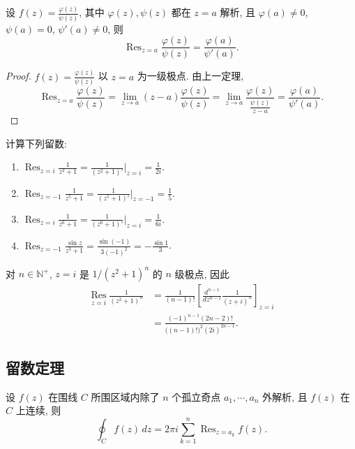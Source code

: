 \documentclass[theorem=false,mathfont=none,openany,sub3section]{easybook}
\begin{document}
\begin{theorem}
  设 $f(z)=\frac{\varphi(z)}{\psi(z)}$, 其中 $\varphi(z),\psi(z)$ 都在 $z=a$ 解析, 且 $\varphi(a)\neq0$, $\psi(a)=0$, $\psi'(a)\neq0$, 则
  \[
  \operatorname{Res}_{z=a}\frac{\varphi(z)}{\psi(z)}=\frac{\varphi(a)}{\psi'(a)}.
  \]
\end{theorem}

\begin{proof}
  $f(z)=\frac{\varphi(z)}{\psi(z)}$ 以 $z=a$ 为一级极点. 由上一定理,
  \[
  \operatorname{Res}_{z=a}\frac{\varphi(z)}{\psi(z)}=\lim_{z\to a}(z-a)\frac{\varphi(z)}{\psi(z)}
  =\lim_{z\to a}\frac{\varphi(z)}{\frac{\psi(z)}{z-a}}=\frac{\varphi(a)}{\psi'(a)}.
  \]
\end{proof}

\begin{example}
  计算下列留数:
  \begin{enumerate}
    \item $\operatorname{Res}_{z=i}\frac{1}{z^{2}+1}=\frac{1}{(z^{2}+1)'}\big|_{z=i}=\frac{1}{2i}$.
    \item $\operatorname{Res}_{z=-1}\frac{1}{z^{5}+1}=\frac{1}{(z^{5}+1)'}\big|_{z=-1}=\frac{1}{5}$.
    \item $\operatorname{Res}_{z=i}\frac{1}{z^{6}+1}=\frac{1}{(z^{6}+1)'}\big|_{z=i}=\frac{1}{6i}$.
    \item $\operatorname{Res}_{z=-1}\frac{\sin z}{z^{3}+1}
    =\frac{\sin(-1)}{3(-1)^{2}}=-\frac{\sin1}{3}$.
  \end{enumerate}
\end{example}

\begin{example}
  对 $n\in\mathbb N^{+}$, $z=i$ 是 $1/(z^{2}+1)^{n}$ 的 $n$ 级极点, 因此
  \[
  \begin{aligned}
  \operatorname*{Res}_{z=i}\frac{1}{(z^{2}+1)^{n}}
  &=\frac{1}{(n-1)!}
    \left[\frac{d^{n-1}}{dz^{n-1}}\frac{1}{(z+i)^{n}}\right]_{z=i}\\
  &=\frac{(-1)^{n-1}(2n-2)!}{\bigl((n-1)!\bigr)^{2}(2i)^{2n-1}}.
  \end{aligned}
  \]
\end{example}

\subsection{留数定理}

\begin{theorem}[留数定理]
  设 $f(z)$ 在围线 $C$ 所围区域内除了 $n$ 个孤立奇点 $a_{1},\cdots,a_{n}$ 外解析, 且 $f(z)$ 在 $C$ 上连续, 则
  \[
  \oint_{C}f(z)\,dz=2\pi i\sum_{k=1}^{n}\operatorname{Res}_{z=a_{k}}f(z).
  \]
\end{theorem}
\end{document}
